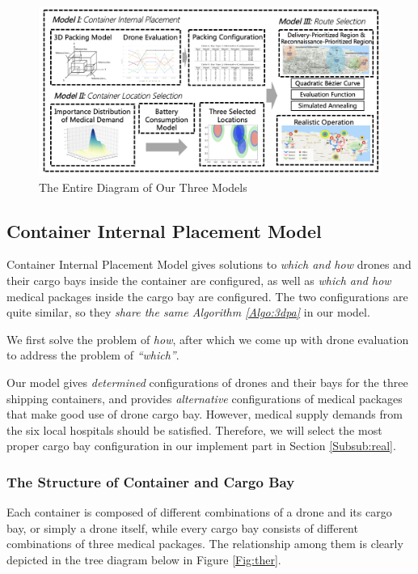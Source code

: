 \documentclass{mcmthesis}
\begin{document}
\begin{figure}[htbp]
    \centering
    \includegraphics[width=17cm]{figures/flowchart.png}
    \caption{The Entire Diagram of Our Three Models}
    \label{Fig:flo}
\end{figure}

\subsection{Container Internal Placement Model}

Container Internal Placement Model gives solutions to \emph{which and how} drones and their cargo bays inside the container are configured, as well as \emph{which and how} medical packages inside the cargo bay are configured. The two configurations are quite similar, so they \emph{share the same Algorithm \ref{Algo:3dpa}} in our model.

We first solve the problem of \emph{how}, after which we come up with drone evaluation to address the problem of \emph{“which”}.

Our model gives \emph{determined} configurations of drones and their bays for the three shipping containers, and provides \emph{alternative} configurations of medical packages that make good use of drone cargo bay. However, medical supply demands from the six local hospitals should be satisfied. Therefore, we will select the most proper cargo bay configuration in our implement part in Section \ref{Subsub:real}.

\subsubsection{The Structure of Container and Cargo Bay}
Each container is composed of different combinations of a drone and its cargo bay, or simply a drone itself, while every cargo bay consists of different combinations of three medical packages. The relationship among them is clearly depicted in the tree diagram below in Figure \ref{Fig:ther}.
\end{document}
